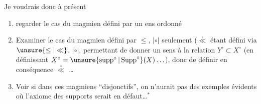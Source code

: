 Je voudrais donc à présent
\begin{enumerate}[label=\arabic*\textsuperscript{o}),leftmargin=*]
\item regarder le cas du magmien  défini par un ens ordonné
\item Examiner le cas du magmien défini par $\leq$, $|\circ|$ seulement ($\overset{\circ}{\ll}$ étant défini via $\unsure{\leq|\ll}$, $|\circ|$,   permettant de donner un sens à la relation $Y^{\circ}\subset X^{\circ}$ (en définissant $X^{\circ}=\unsure{\operatorname{supp}^{\circ}|\operatorname{Supp}^{\circ}}(X)\ldots$), donc de définir en conséquence $\overset{\circ}{\ll}$ \ldots
\item Voir si dans ces magmiens ``disjonctifs'', on n'aurait pas des exemples évidents où l'axiome des supports serait en défaut\ldots$^*$
\end{enumerate}

